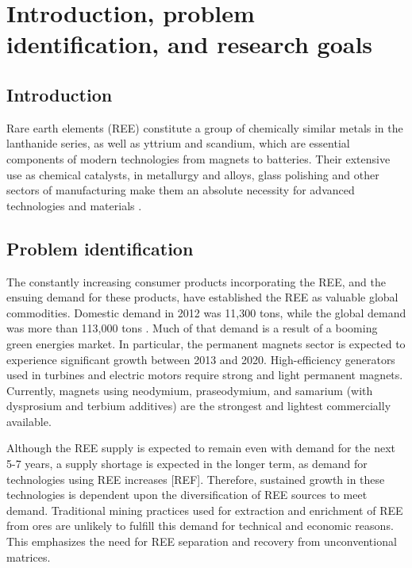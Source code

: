 \chapter{Introduction, problem identification, and research goals}

\clearpage

\section{Introduction}

Rare earth elements (REE) constitute a group of chemically similar metals in the lanthanide series, as well as yttrium and scandium, which are essential components of modern technologies from magnets to batteries.
Their extensive use as chemical catalysts, in metallurgy and alloys, glass polishing and other sectors of manufacturing make them an absolute necessity for advanced technologies and materials \citep{USGS_commsumm}.

\section{Problem identification}

The constantly increasing consumer products incorporating the REE, and the ensuing demand for these products, have established the REE as valuable global commodities.
Domestic demand in 2012 was 11,300 tons, while the global demand was more than 113,000 tons \citep{FrostSullivan_REEmarket}.
Much of that demand is a result of a booming green energies market.
In particular, the permanent magnets sector is expected to experience significant growth between 2013 and 2020.
High-efficiency generators used in turbines and electric motors require strong and light permanent magnets.
Currently, magnets using neodymium, praseodymium, and samarium (with dysprosium and terbium additives) are the strongest and lightest commercially available.

Although the REE supply is expected to remain even with demand for the next 5-7 years, a supply shortage is expected in the longer term, as demand for technologies using REE increases [REF].
Therefore, sustained growth in these technologies is dependent upon the diversification of REE sources to meet demand.
Traditional mining practices used for extraction and enrichment of REE from ores are unlikely to fulfill this demand for technical and economic reasons.
This emphasizes the need for REE separation and recovery from unconventional matrices.

